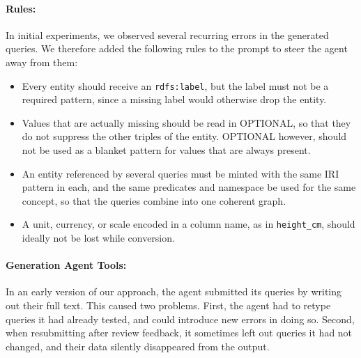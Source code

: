 \paragraph{Rules:}
In initial experiments, we observed several recurring errors in the generated queries. We therefore added the following rules to the prompt to steer the agent away from them:
\begin{itemize}[leftmargin=*, itemsep=2pt]
  \item Every entity should receive an \texttt{rdfs:label}, but the label must not be a required pattern, since a missing label would otherwise drop the entity.
  \item Values that are actually missing should be read in OPTIONAL, so that they do not suppress the other triples of the entity. OPTIONAL however, should not be used as a blanket pattern for values that are always present.
  \item An entity referenced by several queries must be minted with the same IRI pattern in each, and the same predicates and namespace be used for the same concept, so that the queries combine into one coherent graph.
  \item A unit, currency, or scale encoded in a column name, as in \texttt{height\_cm}, should ideally not be lost while conversion.
\end{itemize}

\paragraph{Generation Agent Tools:}
In an early version of our approach, the agent submitted its queries by writing out their full text. This caused two problems. First, the agent had to retype queries it had already tested, and could introduce new errors in doing so. Second, when resubmitting after review feedback, it sometimes left out queries it had not changed, and their data silently disappeared from the output.

